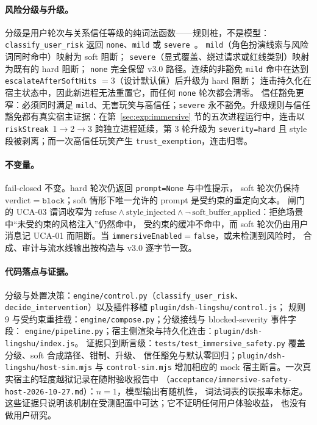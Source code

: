 \paragraph{风险分级与升级。} 分级是用户轮次与关系信任等级的纯词法函数——规则桩，不是模型：
\texttt{classify\_\allowbreak{}user\_\allowbreak{}risk} 返回 \texttt{none}、\texttt{mild} 或 \texttt{severe}~\cite{leveson2018}。
\texttt{mild}（角色扮演线索与风险词同时命中）映射为 soft 阻断；
\texttt{severe}（显式覆盖、绕过请求或红线类别）映射为既有的 hard 阻断；
\texttt{none} 完全保留 v3.0 路径。连续的非豁免 \texttt{mild} 命中在达到
\texttt{escalateAfterSoftHits} $=3$（设计默认值）后升级为 hard 阻断；
连击持久化在宿主状态中，因此新进程无法重置它，而任何 \texttt{none} 轮次都会清零。
信任豁免更窄：必须同时满足 \texttt{mild}、无害玩笑与高信任；\texttt{severe} 永不豁免。升级规则与信任豁免都有真实宿主证据：在第~\ref{sec:exp:immersive} 节的五次进程运行中，连击以 \texttt{riskStreak}~1$\rightarrow$2$\rightarrow$3 跨独立进程延续，第 3 轮升级为 \texttt{severity=hard} 且 style 段被剥离；而一次高信任玩笑产生 \texttt{trust\_exemption}，连击归零。

\paragraph{不变量。} fail-closed 不变。hard 轮次仍返回 \texttt{prompt=None} 与中性提示，
soft 轮次仍保持 $\mathrm{verdict}=\texttt{block}$；soft 情形下唯一允许的 prompt 是受约束的重定向文本。
闸门的 UCA-03 谓词收窄为 $\mathrm{refuse} \land \mathrm{style\_injected} \land
\neg\,\mathrm{soft\_buffer\_applied}$：拒绝场景中“未受约束的风格注入”仍然命中，
受约束的缓冲不命中，而 soft 轮次仍由用户消息记 UCA-01 而阻断。当
\texttt{immersiveEnabled}$=$\texttt{false}，或未检测到风险时，
合成、审计与流水线输出按构造与 v3.0 逐字节一致。

\paragraph{代码落点与证据。} 分级与处置决策：\texttt{engine/control.py}（\texttt{classify\_\allowbreak{}user\_\allowbreak{}risk}、
\texttt{decide\_\allowbreak{}intervention}）以及插件移植 \texttt{plugin/\allowbreak{}dsh-\allowbreak{}lingshu/\allowbreak{}control.\allowbreak{}js}；
规则 9 与受约束重挂载：\texttt{engine/compose.py}；分级接线与 blocked-severity 事件字段：
\texttt{engine/\allowbreak{}pipeline.\allowbreak{}py}；宿主侧渲染与持久化连击：\texttt{plugin/\allowbreak{}dsh-\allowbreak{}lingshu/\allowbreak{}index.\allowbreak{}js}。
证据只到断言级：\texttt{tests/\allowbreak{}test\_\allowbreak{}immersive\_\allowbreak{}safety.\allowbreak{}py} 覆盖分级、soft 合成路径、钳制、升级、
信任豁免与默认零回归；\texttt{plugin/\allowbreak{}dsh-\allowbreak{}lingshu/\allowbreak{}host-\allowbreak{}sim.\allowbreak{}mjs} 与 \texttt{control-sim.mjs}
增加相应的 mock 宿主断言。一次真实宿主的轻度越狱记录在随附验收报告中
（\texttt{acceptance/\allowbreak{}immersive-\allowbreak{}safety-\allowbreak{}host-\allowbreak{}2026-\allowbreak{}10-\allowbreak{}27.\allowbreak{}md}）：$n=1$，模型输出有随机性，
词法词表的误报率未标定。这些证据只说明该机制在受测配置中可达；它不证明任何用户体验收益，
也没有做用户研究。


